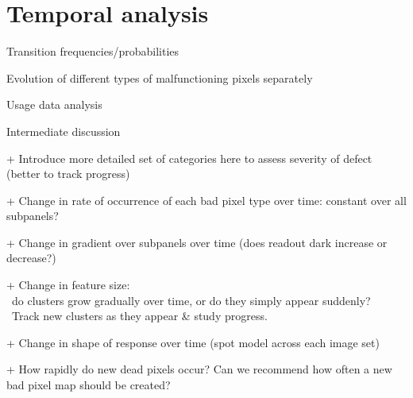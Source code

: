 \documentclass[\main/IO-Pixels.tex]{subfiles}
\begin{document}
\section{Temporal analysis}
\begin{outline}

Transition frequencies/probabilities

Evolution of different types of malfunctioning pixels separately

Usage data analysis

Intermediate discussion

+ Introduce more detailed set of categories here to assess severity of defect (better to track progress)

+ Change in rate of occurrence of each bad pixel type over time: constant over all subpanels?

+ Change in gradient over subpanels over time (does readout dark increase or decrease?)

+ Change in feature size: \\ \-\ do clusters grow gradually over time, or do they simply appear suddenly?\\ \-\ Track new clusters as they appear \& study progress.

+ Change in shape of response over time (spot model across each image set)

+ How rapidly do new dead pixels occur? Can we recommend how often a new bad pixel map should be created?
\end{outline}

\end{document}
